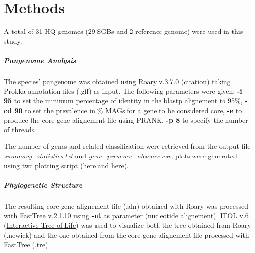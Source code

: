 \section*{Methods}



A total of 31 HQ genomes (29 SGBs and 2 reference genome) were used in this study. 

\nocite{Tange2011a}


\subparagraph*{Pangenome Analysis}

The species' pangenome was obtained using Roary v.3.7.0 (citation) taking Prokka annotation files (.gff) as input. 
The following parameters were given: \textbf{-i 95} to set the minimum percentage of identity
in the blastp alignement to 95\%, \textbf{-cd 90} to set the prevalence in \% MAGs for a gene
to be considered core, \textbf{-e} to produce the core gene alignement file using PRANK, \textbf{-p 8} to
specify the number of threads. 

The number of genes and related classification were retrieved from the output file
\textit{summary\_statistics.txt} and \textit{gene\_presence\_absence.csv}; plots were generated using two
plotting script (\href{https://github.com/sanger-pathogens/Roary/blob/master/bin/create_pan_genome_plots.R}{here}
and \href{https://github.com/sanger-pathogens/Roary/blob/master/contrib/roary_plots/roary_plots.py}{here}).


\subparagraph*{Phylogenetic Structure}

The resulting core gene alignement file (.aln) obtained with Roary was processed with FastTree v.2.1.10
using \textbf{-nt} as parameter (nucleotide alignement). ITOL v.6 (\href{https://itol.embl.de/}{Interactive Tree of Life})
was used to visualize both the tree obtained from Roary (.newick) and the one obtained from the core
gene alignement file processed with FastTree (.tre).




